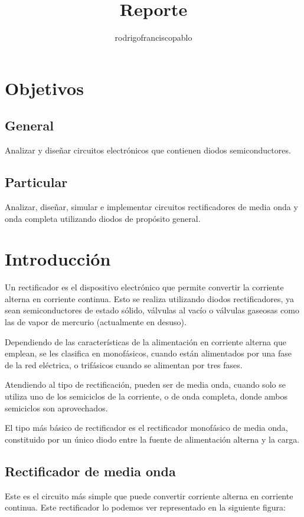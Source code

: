\documentclass{mylib/reporteConCalif}
\title{Reporte}
\author{rodrigofranciscopablo }
\begin{document}
\coverPage


\section{Objetivos}

\subsection{General}

Analizar y diseñar circuitos electrónicos que contienen diodos semiconductores.

\subsection{Particular}

Analizar, diseñar, simular e implementar circuitos rectificadores de media onda y onda completa utilizando diodos de
propósito general.

\section{Introducción}

Un rectificador es el dispositivo electrónico que permite convertir la corriente alterna en corriente continua. Esto se realiza utilizando diodos rectificadores, ya sean semiconductores de estado sólido, válvulas al vacío o válvulas gaseosas como las de vapor de mercurio (actualmente en desuso).

Dependiendo de las características de la alimentación en corriente alterna que emplean, se les clasifica en monofásicos, cuando están alimentados por una fase de la red eléctrica, o trifásicos cuando se alimentan por tres fases.

Atendiendo al tipo de rectificación, pueden ser de media onda, cuando solo se utiliza uno de los semiciclos de la corriente, o de onda completa, donde ambos semiciclos son aprovechados.

El tipo más básico de rectificador es el rectificador monofásico de media onda, constituido por un único diodo entre la fuente de alimentación alterna y la carga.

\subsection{Rectificador de media onda}

Este es el circuito más simple que puede convertir corriente alterna en corriente continua. Este rectificador lo podemos ver representado en la siguiente figura:
\end{document}
